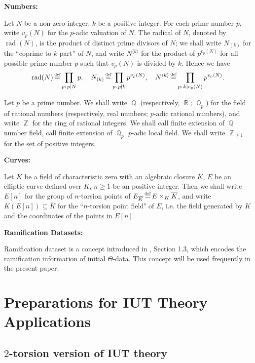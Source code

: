 \documentclass[a4paper, 12pt]{article}
\DeclareMathOperator{\defeq}{\overset{\text{\tiny{def}}}{=}}
\DeclareMathOperator{\Z}{\mathbb{Z}}
\DeclareMathOperator{\Q}{\mathbb{Q}}
\DeclareMathOperator{\R}{\mathbb{R}}
\DeclareMathOperator{\rad}{\text{rad}}
\newcommand{\lagk}[1]{\langle #1 \rangle}
\numberwithin{equation}{section}
\theoremstyle{definition}
\begin{document}
\hfill \break
\noindent\textbf{Numbers:}

Let $N$ be a non-zero integer,  $k$ be a positive integer. For each prime number $p$, write $v_p(N)$ for the $p$-adic valuation of $N$.
The radical of $N$, denoted by $\rad(N)$, is the product of distinct prime divisors of $N$;
we shall write $N_{(k)}$ for the ``coprime to $k$ part'' of $N$, 
and write $N^{\lagk{k}}$ for the product of $p^{v_p(N)}$ for all possible prime number $p$ such that $v_p(N)$ is divided by $k$. 
Hence we have
\begin{align*}
\rad(N) \defeq \prod_{p:\, p\mid N} p, \quad 
N_{(k)} \defeq \prod_{p:\, p\nmid k} p^{v_p(N)}, \quad
N^{\lagk{k}} \defeq \prod_{p:\, k\mid v_p(N)} p^{v_p(N)} . 
\end{align*}

Let $p$ be a prime number.
We shall write $\Q$ (respectively, $\R$; $\Q_p$) for the field of rational numbers (respectively, real numbers; $p$-adic rational numbers), 
and write $\Z$ for the ring of rational integers.
We shall call finite extension of $\Q$ number field, call finite extension of $\Q_p$ $p$-adic local field.
We shall write $\Z_{\ge 1}$ for the set of positive integers.

\hfill \break
\noindent\textbf{Curves:}

Let $K$ be a field of characteristic zero with an algebraic closure $\overline{K}$,
$E$ be an elliptic curve defined over $K$, $n\ge 1$ be an positive integer. 
Then we shall write $E[n]$ for the group of $n$-torsion points of $E_{\overline{K}}\defeq E\times_K \overline{K}$, and write $K(E[n])\subseteq \overline{K}$ for the ``$n$-torsion point field" of $E$, 
i.e. the field generated by $K$ and the coordinates of the points in $E[n]$.        

\hfill \break
\noindent\textbf{Ramification Datasets:}

Ramification dataset is a concept introduced in \cite{Diophantine_after_IUT_I}, Section 1.3, which encodes the ramification information of initial $\Theta$-data.
This concept will be used frequently in the present paper.







\section{Preparations for IUT Theory Applications}

\subsection{$2$-torsion version of IUT theory}
\end{document}
